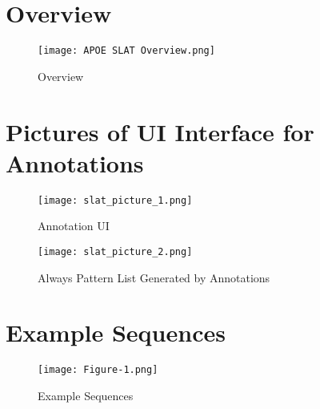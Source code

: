\documentclass[pmlr,twocolumn,10pt]{jmlr} %
\begin{document}
\clearpage

\appendix

\section{Overview}
\begin{figure}[h] \label{app:overview}
\centering 
\texttt{[image: APOE SLAT Overview.png]}
\caption{Overview}

\end{figure}

\clearpage

\section{Pictures of UI Interface for Annotations} 
\label{app:slat}
\begin{figure}[h]
\centering 
\texttt{[image: slat\_picture\_1.png]}
\caption{Annotation UI}
\end{figure}

\begin{figure}[h]
\centering 
\texttt{[image: slat\_picture\_2.png]}
\caption{Always Pattern List Generated by Annotations}
\end{figure}

\clearpage

\section{Example Sequences} 
\begin{figure}[h!] \label{app:examples}
\centering 
\texttt{[image: Figure-1.png]}
\caption{Example Sequences}
\end{figure}

\clearpage

\end{document}
